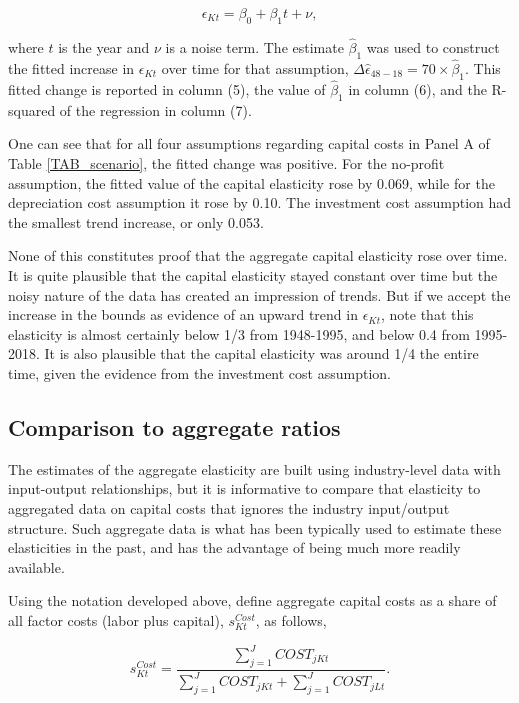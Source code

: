 \documentclass[11pt]{article}
\begin{document}
\begin{equation}
	\epsilon_{Kt} = \beta_0 + \beta_1 t + \nu,
\end{equation}

where $t$ is the year and $\nu$ is a noise term. The estimate $\hat{\beta}_1$ was used to construct the fitted increase in $\epsilon_{Kt}$ over time for that assumption, $\Delta \hat{\epsilon}_{48-18} = 70 \times \hat{\beta}_1$. This fitted change is reported in column (5), the value of $\hat{\beta}_1$ in column (6), and the R-squared of the regression in column (7). 

One can see that for all four assumptions regarding capital costs in Panel A of Table \ref{TAB_scenario}, the fitted change was positive. For the no-profit assumption, the fitted value of the capital elasticity rose by 0.069, while for the depreciation cost assumption it rose by 0.10. The investment cost assumption had the smallest trend increase, or only 0.053. 

None of this constitutes proof that the aggregate capital elasticity rose over time. It is quite plausible that the capital elasticity stayed constant over time but the noisy nature of the data has created an impression of trends. But if we accept the increase in the bounds as evidence of an upward trend in $\epsilon_{Kt}$, note that this elasticity is almost certainly below 1/3 from 1948-1995, and below 0.4 from 1995-2018. It is also plausible that the capital elasticity was around 1/4 the entire time, given the evidence from the investment cost assumption.

\subsection{Comparison to aggregate ratios}
The estimates of the aggregate elasticity are built using industry-level data with input-output relationships, but it is informative to compare that elasticity to aggregated data on capital costs that ignores the industry input/output structure. Such aggregate data is what has been typically used to estimate these elasticities in the past, and has the advantage of being much more readily available.

Using the notation developed above, define aggregate capital costs as a share of all factor costs (labor plus capital), $s^{Cost}_{Kt}$, as follows,

\begin{equation}
	s^{Cost}_{Kt} = \frac{\sum_{j=1}^{J} COST_{jKt}}{\sum_{j=1}^{J} COST_{jKt} + \sum_{j=1}^{J} COST_{jLt}}. \label{EQ_scost}
\end{equation}
\end{document}
